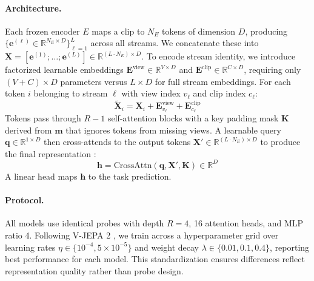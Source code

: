 \documentclass{article}
\newcommand{\R}{\mathbb{R}}
\theoremstyle{plain}
\theoremstyle{definition}
\theoremstyle{remark}
\begin{document}
\paragraph{Architecture.}
Each frozen encoder $E$ maps a clip to $N_E$ tokens of dimension $D$, producing $\{\mathbf{e}^{(\ell)} \in \R^{N_E \times D}\}_{\ell=1}^L$ across all streams. We concatenate these into $\mathbf{X} = [\mathbf{e}^{(1)}; \ldots; \mathbf{e}^{(L)}] \in \R^{(L \cdot N_E) \times D}$. To encode stream identity, we introduce factorized learnable embeddings $\mathbf{E}^{\text{view}} \in \R^{V \times D}$ and $\mathbf{E}^{\text{clip}} \in \R^{C \times D}$, requiring only $(V + C) \times D$ parameters versus $L \times D$ for full stream embeddings. For each token $i$ belonging to stream $\ell$ with view index $v_\ell$ and clip index $c_\ell$:
\begin{equation}
    \tilde{\mathbf{X}}_i = \mathbf{X}_i + \mathbf{E}^{\text{view}}_{v_\ell} + \mathbf{E}^{\text{clip}}_{c_\ell}
\end{equation}
Tokens pass through $R-1$ self-attention blocks with a key padding mask $\mathbf{K}$ derived from $\mathbf{m}$ that ignores tokens from missing views. A learnable query $\mathbf{q} \in \R^{1 \times D}$ then cross-attends to the output tokens $\mathbf{X}' \in \R^{(L \cdot N_E) \times D}$ to produce the final representation \citep{vaswani2023attentionneed}:
\begin{equation}
    \mathbf{h} = \text{CrossAttn}(\mathbf{q}, \mathbf{X}', \mathbf{K}) \in \R^{D}
\end{equation}
A linear head maps $\mathbf{h}$ to the task prediction.

\paragraph{Protocol.}
All models use identical probes with depth $R = 4$, 16 attention heads, and MLP ratio 4. Following V-JEPA 2 \citep{vjepa2}, we train across a hyperparameter grid over learning rates $\eta \in \{10^{-4}, 5 \times 10^{-5}\}$ and weight decay $\lambda \in \{0.01, 0.1, 0.4\}$, reporting best performance for each model. This standardization ensures differences reflect representation quality rather than probe design.



\end{document}
